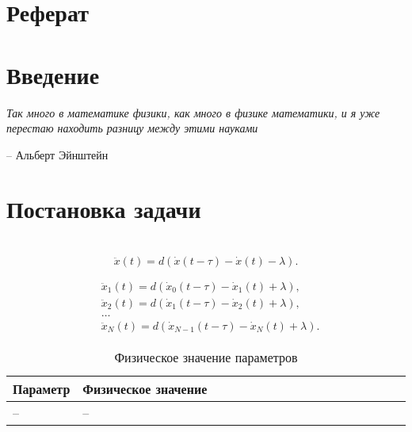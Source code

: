 \documentclass[12pt, a4paper]{extarticle}
\numberwithin{equation}{section}
\begin{document}
\justify 
\setlength{\parindent}{1.25cm} 
\newpage 
\thispagestyle{empty} 
\setcounter{page}{2} 
\section*{Реферат}
\vspace{\baselineskip}	

\newpage

\setcounter{page}{2}

\tableofcontents 
\newpage 

\section*{Введение}
\epigraph{\textit{Так много в математике физики, как много в физике математики, и я уже перестаю находить разницу между этими науками}}
{-- Альберт Эйнштейн}
 
\newpage

\section{Постановка задачи} 
  

\newpage

\section{}

\begin{equation*}
\ddot{x}(t) = d (\dot{x}(t-\tau)-\dot{x}(t) - \lambda).
\end{equation*}

\begin{equation*}
\begin{split}
&\ddot{x}_1(t) = d (\dot{x}_0(t-\tau)-\dot{x}_1(t) + \lambda), \\ 
&\ddot{x}_2(t) = d (\dot{x}_1(t-\tau)-\dot{x}_2(t) + \lambda), \\
&\ldots \\
&\ddot{x}_N(t) = d (\dot{x}_{N-1}(t-\tau)-\dot{x}_N(t) + \lambda).
\end{split}
\end{equation*}

\begin{table}[h]
	\caption{Физическое значение параметров}
	\label{parameters}
	\begin{center}
		\begin{tabularx}{\textwidth}{p{0.15\linewidth}p{0.85\linewidth}}
			
			\hline
			\rule{0cm}{0,5cm}
			Параметр &  Физическое значение \\ 
			[3pt]\hline
			-- & -- \\
			\hline
		\end{tabularx}
	\end{center}
\end{table}
\end{document}
